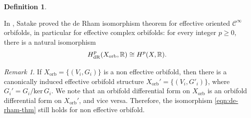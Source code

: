 \documentclass[12pt]{amsart}
\newcommand{\<}{\leq}
\def\>{\geq}
\def\subset{\subseteq}
\theoremstyle{remark}
\newtheorem{remark}[theorem]{Remark}
\theoremstyle{definition}
\newtheorem{definition}[theorem]{Definition}
\theoremstyle{definition}
\numberwithin{equation}{section}
\theoremstyle{definition}
\theoremstyle{definition}
\def\orb{\mathrm{orb}}
\begin{document}
\begin{definition}
\begin{enumerate}



  
\end{enumerate}
\end{definition}

In \cite[Theorem 1]{Satake1956}, Satake proved the de Rham isomorphism theorem for effective  oriented 
$\mathcal{C}^\infty$ orbifolds, in particular for effective  complex orbifolds: for every integer $p\> 0$,  there is a natural isomorphism
\begin{equation}\label{eqn:de-rham-thm}
H^p_{\rm dR}(X_{\orb},\mathbb{R}) \cong H^p(X,\mathbb{R}).    
\end{equation}
 




 \begin{remark}\label{remark-orbifold-def} 
 If $X_{\orb} = \{(V_i,G_i)\}$ is a non effective orbifold, then there is a canonically induced effective orbifold structure $X_{\orb}' = \{(V_i, G'_i)\}$, where $G_i' = G_i/\mathrm{ker}\, G_i$. 
 We note that an orbifold differential form on $X_{\orb}$ is an orbifold differential form on $X_{\orb}'$, and vice versa. 
 Therefore, the  isomorphism  \eqref{eqn:de-rham-thm} still holds for non effective orbifold. 

\end{remark}
\end{document}
